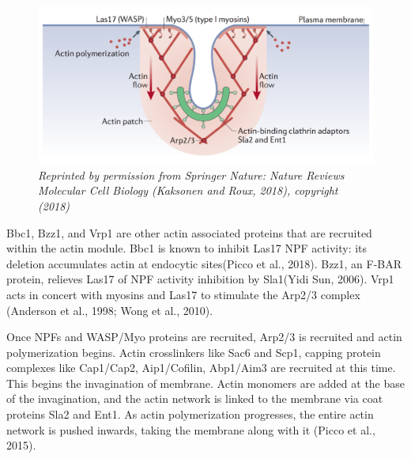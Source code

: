 


	\begin{figure}[H]
	\centering
	\includegraphics[scale=0.5]{figures/intro/actin_kaksonen}
	\caption[Actin network in endocytosis]
	{	\textit{Reprinted by permission from Springer Nature: Nature Reviews Molecular Cell Biology (Kaksonen and Roux, 2018), copyright (2018)
	\label{intro_actin_netork}}}
\end{figure}


Bbc1, Bzz1, and Vrp1 are other actin associated proteins that are recruited within the actin module. Bbc1 is known to inhibit Las17 NPF activity: its deletion accumulates actin at endocytic sites(Picco et al., 2018). Bzz1, an F-BAR protein, relieves Las17 of NPF activity inhibition by Sla1(Yidi Sun, 2006). Vrp1 acts in concert with myosins and Las17 to stimulate the Arp2/3 complex (Anderson et al., 1998; Wong et al., 2010). 

			\vspace{5mm}
Once NPFs and WASP/Myo proteins are recruited, Arp2/3 is recruited and actin polymerization begins. Actin crosslinkers like Sac6 and Scp1, capping protein complexes like Cap1/Cap2, Aip1/Cofilin, Abp1/Aim3 are recruited at this time. This begins the invagination of membrane. Actin monomers are added at the base of the invagination, and the actin network is linked to the membrane via coat proteins Sla2 and Ent1. As actin polymerization progresses, the entire actin network is pushed inwards, taking the membrane along with it (Picco et al., 2015).	

\newpage
